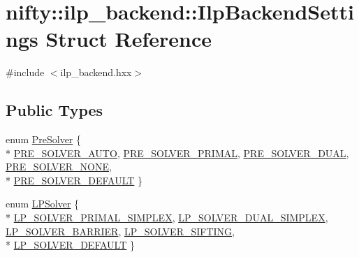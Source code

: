 \hypertarget{structnifty_1_1ilp__backend_1_1IlpBackendSettings}{}\section{nifty\+:\+:ilp\+\_\+backend\+:\+:Ilp\+Backend\+Settings Struct Reference}
\label{structnifty_1_1ilp__backend_1_1IlpBackendSettings}


{\ttfamily \#include $<$ilp\+\_\+backend.\+hxx$>$}

\subsection*{Public Types}
\begin{DoxyCompactItemize}
\item 
enum \hyperlink{structnifty_1_1ilp__backend_1_1IlpBackendSettings_ad16c71cc049dcb37c07f2abdda69dab4}{Pre\+Solver} \{ \\*
\hyperlink{structnifty_1_1ilp__backend_1_1IlpBackendSettings_ad16c71cc049dcb37c07f2abdda69dab4a2d2186dcdaa22ae42023acbc03922c48}{P\+R\+E\+\_\+\+S\+O\+L\+V\+E\+R\+\_\+\+A\+U\+T\+O}, 
\hyperlink{structnifty_1_1ilp__backend_1_1IlpBackendSettings_ad16c71cc049dcb37c07f2abdda69dab4a0b937d225c3ee4733bff63397c614b78}{P\+R\+E\+\_\+\+S\+O\+L\+V\+E\+R\+\_\+\+P\+R\+I\+M\+A\+L}, 
\hyperlink{structnifty_1_1ilp__backend_1_1IlpBackendSettings_ad16c71cc049dcb37c07f2abdda69dab4a53cbe16a2893471008b7f3c00c5c040f}{P\+R\+E\+\_\+\+S\+O\+L\+V\+E\+R\+\_\+\+D\+U\+A\+L}, 
\hyperlink{structnifty_1_1ilp__backend_1_1IlpBackendSettings_ad16c71cc049dcb37c07f2abdda69dab4ad0065467805a6fba8d8d9e7293e4bfc2}{P\+R\+E\+\_\+\+S\+O\+L\+V\+E\+R\+\_\+\+N\+O\+N\+E}, 
\\*
\hyperlink{structnifty_1_1ilp__backend_1_1IlpBackendSettings_ad16c71cc049dcb37c07f2abdda69dab4a45adcc6c0d30422e0c0a674b2fe92a37}{P\+R\+E\+\_\+\+S\+O\+L\+V\+E\+R\+\_\+\+D\+E\+F\+A\+U\+L\+T}
 \}
\item 
enum \hyperlink{structnifty_1_1ilp__backend_1_1IlpBackendSettings_a4b3fd0d313a8d95f9f6a3ba64802e204}{L\+P\+Solver} \{ \\*
\hyperlink{structnifty_1_1ilp__backend_1_1IlpBackendSettings_a4b3fd0d313a8d95f9f6a3ba64802e204a02afc6e85659e3fda7c48df74d3e3934}{L\+P\+\_\+\+S\+O\+L\+V\+E\+R\+\_\+\+P\+R\+I\+M\+A\+L\+\_\+\+S\+I\+M\+P\+L\+E\+X}, 
\hyperlink{structnifty_1_1ilp__backend_1_1IlpBackendSettings_a4b3fd0d313a8d95f9f6a3ba64802e204aadd4ba29f78f9104467f136c05d6e354}{L\+P\+\_\+\+S\+O\+L\+V\+E\+R\+\_\+\+D\+U\+A\+L\+\_\+\+S\+I\+M\+P\+L\+E\+X}, 
\hyperlink{structnifty_1_1ilp__backend_1_1IlpBackendSettings_a4b3fd0d313a8d95f9f6a3ba64802e204afbfc81377d73d1c59b31be26a8bf8fb2}{L\+P\+\_\+\+S\+O\+L\+V\+E\+R\+\_\+\+B\+A\+R\+R\+I\+E\+R}, 
\hyperlink{structnifty_1_1ilp__backend_1_1IlpBackendSettings_a4b3fd0d313a8d95f9f6a3ba64802e204ac6de1eff7352159f0db89583e569f86e}{L\+P\+\_\+\+S\+O\+L\+V\+E\+R\+\_\+\+S\+I\+F\+T\+I\+N\+G}, 
\\*
\hyperlink{structnifty_1_1ilp__backend_1_1IlpBackendSettings_a4b3fd0d313a8d95f9f6a3ba64802e204a24fa810f69bf55c40d68082a2e3653f8}{L\+P\+\_\+\+S\+O\+L\+V\+E\+R\+\_\+\+D\+E\+F\+A\+U\+L\+T}
 \}
\end{DoxyCompactItemize}
